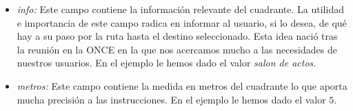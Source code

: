 \begin{itemize}
	\item \textit{info:} Este campo contiene la información relevante del cuadrante. La utilidad e importancia de este campo radica en informar al usuario, si lo desea, de qué hay a su paso por la ruta hasta el destino seleccionado. Esta idea nació tras la reunión en la ONCE en la que nos acercamos mucho a las necesidades de nuestros usuarios. En el ejemplo le hemos dado el valor \textit{salon de actos}.
	
	\item \textit{metros:} Este campo contiene la medida en metros del cuadrante lo que aporta mucha precisión a las instrucciones. En el ejemplo le hemos dado el valor $5$.
\end{itemize}




